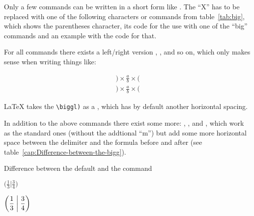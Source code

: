 \medskip{}
Only a few commands can be written in a short form like .
The ``X{}'' has to be replaced with one of the following characters
or commands from table~\vref{tab:big}, which shows the parentheses
character, its code for the use with one of the ``big{}'' commands
and an example with the code for that.

%
For all commands there exists a left/right version  , 
,  and so on, which only makes sense when writing things like:

\begin{LTXexample}[width=0.3\linewidth,wide]
\begin{align} 
  \biggl)\times \frac{a}{b} \times\biggr( 
\end{align}
\begin{align} 
  \bigg)\times \frac{a}{b} \times\bigg( 
\end{align}
\end{LTXexample}

\LaTeX{} takes the \verb|\biggl)| as a , which has by default
another horizontal spacing.

In addition to the above  commands there exist some more:
, ,  and ,
which work as the standard ones (without the addtional ``m{}'')
but add some more horizontal space%
between the delimiter and the formula before and after (see 
table~\vref{cap:Difference-between-the-bigg}).




\begin{table}[!htb]
\caption{Difference between the default
 and the  command}\label{cap:Difference-between-the-bigg}
\begin{LTXexample}
$\bigg(\displaystyle\frac{1}{3}\bigg|\frac{3}{4}\bigg)$
\end{LTXexample}
\vspace{-15pt}
\begin{LTXexample}
$\bigg(\displaystyle\frac{1}{3}\biggm|\frac{3}{4}\bigg)$
\end{LTXexample}
\end{table}


